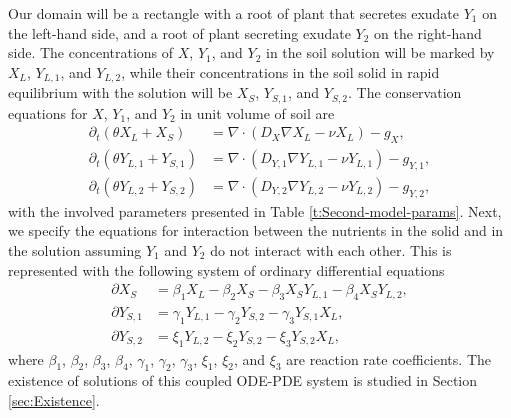 \documentclass[11pt]{article}
\numberwithin{equation}{section}
\begin{document}
Our domain will be a rectangle with a root of plant that secretes exudate $Y_1$ on the left-hand side, and a root of plant secreting exudate $Y_2$ on the right-hand side. The concentrations of $X$, $Y_1$, and $Y_2$ in the soil solution will be marked by $X_L$, $Y_{L,1}$, and $Y_{L,2}$, while their concentrations in the soil solid in rapid equilibrium with the solution will be $X_S$, $Y_{S,1}$, and $Y_{S,2}$. The conservation equations for $X$, $Y_1$, and $Y_2$ in unit volume of soil are
\begin{subequations}
\label{x_1}
\begin{align}
	\partial_t(\theta X_L + X_S) &= \nabla \cdot(D_X \nabla X_L - \nu X_L) - g_X, \\
	\partial_t(\theta Y_{L,1} + Y_{S,1}) &= \nabla \cdot(D_{Y,1} \nabla Y_{L,1} - \nu Y_{L,1}) - g_{Y,1}, \\
	\partial_t(\theta Y_{L,2} + Y_{S,2}) &= \nabla \cdot(D_{Y,2} \nabla Y_{L,2} - \nu Y_{L,2}) - g_{Y,2},
\end{align}
\end{subequations}
with the involved parameters presented in Table \ref{t:Second-model-params}. Next, we specify the equations for interaction between the nutrients in the solid and in the solution assuming $Y_1$ and $Y_2$ do not interact with each other. This is represented with the following system of ordinary differential equations
\begin{subequations}
\label{sys:eq-mod-2}
\begin{align}
	\partial X_S &= \beta_1 X_L - \beta_2 X_S - \beta_3 X_S Y_{L,1} - \beta_4 X_S Y_{L,2},  \\
	\partial Y_{S,1} &= \gamma_1 Y_{L,1} - \gamma_2 Y_{S,2} - \gamma_3 Y_{S,1} X_L, \\
	\partial Y_{S,2} &= \xi_1 Y_{L,2} - \xi_2 Y_{S,2} - \xi_3 Y_{S,2} X_L,
\end{align}	
\end{subequations}
where $\beta_1$, $\beta_2$, $\beta_3$, $\beta_4$, $\gamma_1$, $\gamma_2$, $\gamma_3$, $\xi_1$, $\xi_2$, and $\xi_3$ are reaction rate coefficients. The existence of solutions of this coupled ODE-PDE system is studied in Section \ref{sec:Existence}. 
\end{document}
